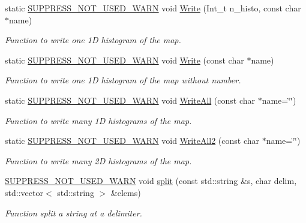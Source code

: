 \begin{DoxyCompactItemize}
static \hyperlink{HistClass_8hh_a85edd6ac47f5ea2970c76af20855738c}{S\-U\-P\-P\-R\-E\-S\-S\-\_\-\-N\-O\-T\-\_\-\-U\-S\-E\-D\-\_\-\-W\-A\-R\-N} void \hyperlink{namespaceHistClass_a4e32418150e24c0831808ff81fe72f17}{Write} (Int\-\_\-t n\-\_\-histo, const char $\ast$name)
\begin{DoxyCompactList}\small\item\em Function to write one 1\-D histogram of the map. \end{DoxyCompactList}\item 
static \hyperlink{HistClass_8hh_a85edd6ac47f5ea2970c76af20855738c}{S\-U\-P\-P\-R\-E\-S\-S\-\_\-\-N\-O\-T\-\_\-\-U\-S\-E\-D\-\_\-\-W\-A\-R\-N} void \hyperlink{namespaceHistClass_a1c14a1588d2bd2524d659c5db93007eb}{Write} (const char $\ast$name)
\begin{DoxyCompactList}\small\item\em Function to write one 1\-D histogram of the map without number. \end{DoxyCompactList}\item 
static \hyperlink{HistClass_8hh_a85edd6ac47f5ea2970c76af20855738c}{S\-U\-P\-P\-R\-E\-S\-S\-\_\-\-N\-O\-T\-\_\-\-U\-S\-E\-D\-\_\-\-W\-A\-R\-N} void \hyperlink{namespaceHistClass_a86d1965748fbd982ddcbca5bb62863e9}{Write\-All} (const char $\ast$name=\char`\"{}\char`\"{})
\begin{DoxyCompactList}\small\item\em Function to write many 1\-D histograms of the map. \end{DoxyCompactList}\item 
static \hyperlink{HistClass_8hh_a85edd6ac47f5ea2970c76af20855738c}{S\-U\-P\-P\-R\-E\-S\-S\-\_\-\-N\-O\-T\-\_\-\-U\-S\-E\-D\-\_\-\-W\-A\-R\-N} void \hyperlink{namespaceHistClass_ac9972fbc605ed3de9c687c518e740178}{Write\-All2} (const char $\ast$name=\char`\"{}\char`\"{})
\begin{DoxyCompactList}\small\item\em Function to write many 2\-D histograms of the map. \end{DoxyCompactList}\item 
\hyperlink{HistClass_8hh_a85edd6ac47f5ea2970c76af20855738c}{S\-U\-P\-P\-R\-E\-S\-S\-\_\-\-N\-O\-T\-\_\-\-U\-S\-E\-D\-\_\-\-W\-A\-R\-N} void \hyperlink{namespaceHistClass_a1e46657e3e96e1344690fb3e9a8fb45e}{split} (const std\-::string \&s, char delim, std\-::vector$<$ std\-::string $>$ \&elems)
\begin{DoxyCompactList}\small\item\em Function split a string at a delimiter. \end{DoxyCompactList}\item 

\end{DoxyCompactItemize}
